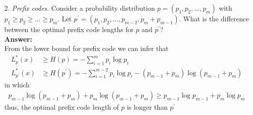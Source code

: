 \documentclass[12pt]{article}
\begin{document}
	\par 
	
	2. \textit{Prefix codes.} Consider a probability distribution $p=(p_1,p_2,...,p_m)$ with $p_1\geq p_2\geq...\geq p_m$. Let $p^\prime=(p_1,p_2,...,p_{m-2},p_m+p_{m-1})$. What is the difference between the optimal prefix code lengths for $p$ and $p^\prime$? \\
	\textbf{Answer:} \\
	From the lower bound for prefix code we can infer that 
	\begin{align*}
		L^{*}_{p}(x) &\geq H(p) =  - \sum_{i = 1}^{m} p_i\log p_i \\
		L^{*}_{p^\prime}(x) &\geq H(p^\prime) = -\sum_{i=1}^{m-2} p_i\log p_i - (p_{m-1}+p_m)\log(p_{m-1}+p_m) 
	\end{align*}
	in which
	\begin{align*}
		p_{m-1}\log(p_{m-1}+p_m) + p_m\log(p_{m-1}+p_m) \geq p_{m-1}\log p_{m-1} + p_m\log p_m
	\end{align*}
	thus, the optimal prefix code length of $p$ is longer than $p^\prime$
	\\
	\par 
	
\end{document}
